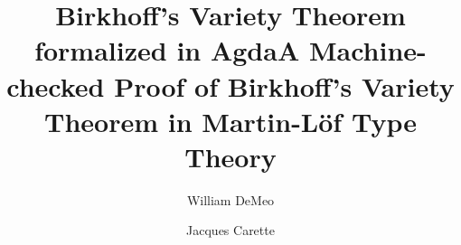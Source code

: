 \documentclass[a4paper,UKenglish,cleveref,autoref,thm-restate]{lipics-v2021}
\title{Birkhoff's Variety Theorem formalized in Agda}
\title{A Machine-checked Proof of Birkhoff's Variety Theorem in Martin-L\"of Type Theory}
\author{William DeMeo}
       {Thmpr Research}
       {williamdemeo@gmail.com}{https://orcid.org/0000-0003-1832-5690}{supported
         by the CoCoSym project under ERC Consolidator Grant No.~771005.}
\author{Jacques Carette}{McMaster University}{carette@mcmaster.ca}{https://orcid.org/0000-0001-8993-9804}{}
\begin{document}
\maketitle



\begin{abstract}

\end{abstract}


\providecommand{\hypertarget}[2]{#2}

\renewcommand\texttt[1]{\textsf{#1}}

% 
% 
% 
% 
% 

\end{document}
